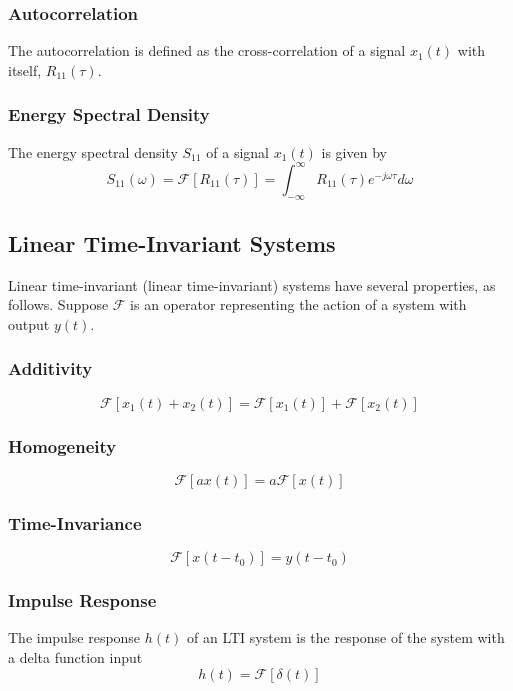 \documentclass[]{article}
\begin{document}
\begin{multicols}{2}
\subsubsection{Autocorrelation}
The autocorrelation is defined as the cross-correlation of a signal $x_{1}(t)$ with itself, $R_{11}(\tau)$.
\subsubsection{Energy Spectral Density}
The energy spectral density $S_{11}$ of a signal $x_{1}(t)$ is given by
\begin{equation}S_{11}(\omega) = \mathscr{F}[R_{11}(\tau)] = \int_{-\infty}^{\infty}R_{11}(\tau)e^{-j\omega \tau}d\omega\label{energy_spectral_density} \end{equation}
\subsection{Linear Time-Invariant Systems}
Linear time-invariant (linear time-invariant) systems have several properties, as follows. Suppose $\mathcal{F}$ is an operator representing the action of a system with output $y(t)$.
\subsubsection{Additivity}
\begin{equation}\mathcal{F}[x_{1}(t) +x_{2}(t)] = \mathcal{F}[x_{1}(t)] + \mathcal{F}[x_{2}(t)]\label{lti_additivity}\end{equation}
\subsubsection{Homogeneity}
\begin{equation}\mathcal{F}[ax(t)] = a\mathcal{F}[x(t)]\label{lti_homogeneity} \end{equation}
\subsubsection{Time-Invariance}
\begin{equation}\mathcal{F}[x(t-t_{0})] = y(t-t_{0})\label{lti_time_invariance} \end{equation}
\subsubsection{Impulse Response}
The impulse response $h(t)$ of an LTI system is the response of the system with a delta function input
\begin{equation} h(t) = \mathcal{F}[\delta(t)] \label{impulse_response_def}\end{equation}

\end{multicols}
\end{document}
